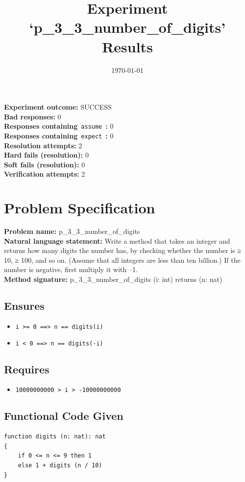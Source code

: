 \documentclass{article}
\begin{document}
\title{Experiment `p\_3\_3\_number\_of\_digits' Results}
\author{\today}
\date{}
\maketitle
\textbf{Experiment outcome: }SUCCESS
\\\textbf{Bad responses: }0
\\\textbf{Responses containing}~\texttt{assume}~\textbf{: }0
\\\textbf{Responses containing}~\texttt{expect}~\textbf{: }0
\\\textbf{Resolution attempts: }2
\\\textbf{Hard fails (resolution): }0
\\\textbf{Soft fails (resolution): }0
\\\textbf{Verification attempts: }2
\section*{Problem Specification}
\textbf{Problem name: }p\_3\_3\_number\_of\_digits
\\\textbf{Natural language statement: }Write a method that takes an integer and returns how many digits the number has, by checking whether the number is ≥ 10, ≥ 100, and so on. (Assume that all integers are less than ten billion.) If the number is negative, first multiply it with –1.
\\\textbf{Method signature: }p\_3\_3\_number\_of\_digits (i: int) returns (n: nat)
\subsection*{Ensures}
\begin{itemize}
\item \texttt{i >= 0 ==> n == digits(i)}
\item \texttt{i < 0 ==> n == digits(-i)}
\end{itemize}
\subsection*{Requires}
\begin{itemize}
\item \texttt{10000000000 > i > -10000000000}
\end{itemize}
\subsection*{Functional Code Given}
\begin{lstlisting}
function digits (n: nat): nat
{
    if 0 <= n <= 9 then 1
    else 1 + digits (n / 10)
}
\end{lstlisting}
\clearpage
\end{document}
